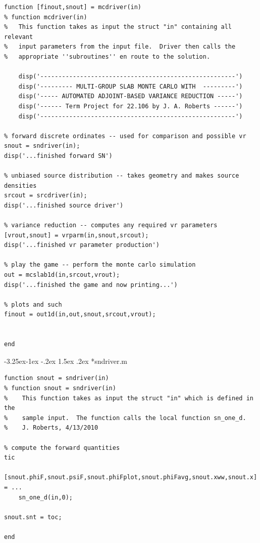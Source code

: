 \documentclass[letter,11pt]{article}
\makeatletter
\renewcommand\subsection{\@startsection{subsection}{2}{\z@}%
                                {-3.25ex\@plus -1ex \@minus -.2ex}%
                                {1.5ex \@plus .2ex}%
                                {\normalfont\itshape\bf}}
\makeatother
\begin{document}
{\small

\begin{verbatim}
function [finout,snout] = mcdriver(in)
% function mcdriver(in)
%   This function takes as input the struct "in" containing all relevant
%   input parameters from the input file.  Driver then calls the
%   appropriate ''subroutines'' en route to the solution.

    disp('------------------------------------------------------')
    disp('--------- MULTI-GROUP SLAB MONTE CARLO WITH  ---------')
    disp('----- AUTOMATED ADJOINT-BASED VARIANCE REDUCTION -----')
    disp('------ Term Project for 22.106 by J. A. Roberts ------')
    disp('------------------------------------------------------')

% forward discrete ordinates -- used for comparison and possible vr
snout = sndriver(in);
disp('...finished forward SN')

% unbiased source distribution -- takes geometry and makes source densities
srcout = srcdriver(in);
disp('...finished source driver')

% variance reduction -- computes any required vr parameters
[vrout,snout] = vrparm(in,snout,srcout);
disp('...finished vr parameter production')

% play the game -- perform the monte carlo simulation
out = mcslab1d(in,srcout,vrout);
disp('...finished the game and now printing...')

% plots and such
finout = out1d(in,out,snout,srcout,vrout);


end
\end{verbatim}
}

\subsection*{{\sf sndriver.m} }

{\small
\begin{verbatim}
function snout = sndriver(in)
% function snout = sndriver(in)
%    This function takes as input the struct "in" which is defined in the
%    sample input.  The function calls the local function sn_one_d.
%    J. Roberts, 4/13/2010

% compute the forward quantities
tic

[snout.phiF,snout.psiF,snout.phiFplot,snout.phiFavg,snout.xww,snout.x] = ...
    sn_one_d(in,0);

snout.snt = toc;

end

\end{verbatim}
}
\end{document}
